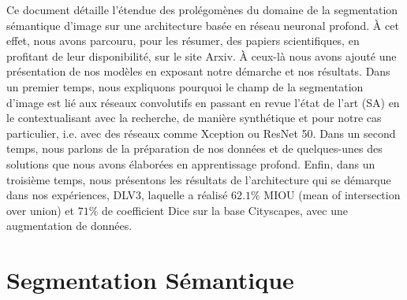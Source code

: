 \documentclass[
10pt, %
a4paper, %
oneside, %
headinclude,footinclude, %
]{scrartcl}
\begin{document}
Ce document détaille l’étendue des prolégomènes du domaine de la segmentation sémantique d’image sur une architecture basée en réseau neuronal profond. À cet effet, nous avons parcouru, pour les résumer, des papiers scientifiques, en profitant de leur disponibilité, sur le site Arxiv. À ceux-là nous avons ajouté une présentation de nos modèles en exposant notre démarche et nos résultats. Dans un premier temps, nous expliquons pourquoi le champ de la segmentation d’image est lié aux réseaux convolutifs en passant en revue l’état de l’art (\gls{SA}) en le contextualisant avec la recherche, de manière synthétique et pour notre cas particulier, i.e. avec des réseaux comme Xception ou ResNet 50. Dans un second temps, nous parlons de la préparation de nos données et de quelques-unes des solutions que nous avons élaborées en apprentissage profond. Enfin, dans un troisième temps, nous présentons les résultats de l’architecture qui se démarque dans nos expériences, \gls{DLV3}, laquelle a réalisé $62.1\%$ \gls{MIOU} (mean of intersection over union) et $71\%$ de coefficient \gls{Dice} sur la base Cityscapes, avec une augmentation de données.







\section{Segmentation Sémantique}
\end{document}
